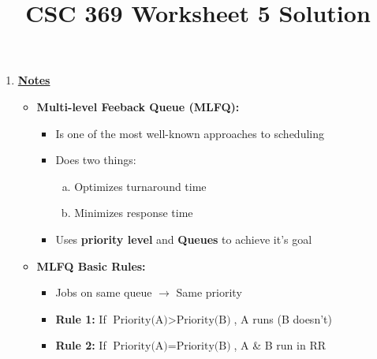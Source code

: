 \documentclass[12pt]{article}
\begin{document}
\title{CSC 369 Worksheet 5 Solution}
\maketitle

\bigskip

\begin{enumerate}[1.]
    \item

    \bigskip

    \underline{\textbf{Notes}}

    \begin{itemize}
        \item \textbf{Multi-level Feeback Queue (MLFQ):}

        \begin{itemize}
            \item Is one of the most well-known approaches to scheduling
            \item Does two things:

            \begin{enumerate}[a)]
                \item Optimizes turnaround time
                \item Minimizes response time
            \end{enumerate}

            \item Uses \textbf{priority level} and \textbf{Queues} to achieve it's goal
        \end{itemize}

        \item \textbf{MLFQ Basic Rules:}
        \begin{itemize}
            \item Jobs on same queue $\to$ Same priority
            \item \textbf{Rule 1:} If $\text{Priority(A)} > \text{Priority(B)}$, A runs (B doesn't)
            \item \textbf{Rule 2:} If $\text{Priority(A)} = \text{Priority(B)}$, A \& B run in RR
        \end{itemize}

        \bigskip


\end{itemize}
\end{enumerate}
\end{document}
